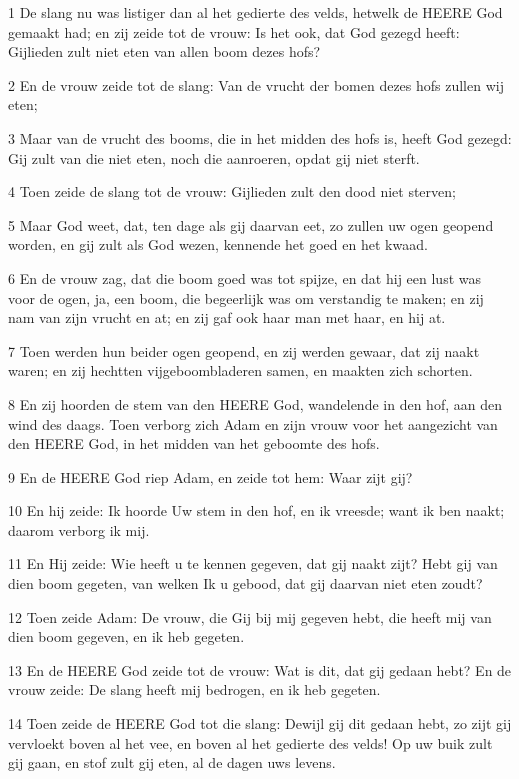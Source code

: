 \par 1 De slang nu was listiger dan al het gedierte des velds, hetwelk de HEERE God gemaakt had; en zij zeide tot de vrouw: Is het ook, dat God gezegd heeft: Gijlieden zult niet eten van allen boom dezes hofs?
\par 2 En de vrouw zeide tot de slang: Van de vrucht der bomen dezes hofs zullen wij eten;
\par 3 Maar van de vrucht des booms, die in het midden des hofs is, heeft God gezegd: Gij zult van die niet eten, noch die aanroeren, opdat gij niet sterft.
\par 4 Toen zeide de slang tot de vrouw: Gijlieden zult den dood niet sterven;
\par 5 Maar God weet, dat, ten dage als gij daarvan eet, zo zullen uw ogen geopend worden, en gij zult als God wezen, kennende het goed en het kwaad.
\par 6 En de vrouw zag, dat die boom goed was tot spijze, en dat hij een lust was voor de ogen, ja, een boom, die begeerlijk was om verstandig te maken; en zij nam van zijn vrucht en at; en zij gaf ook haar man met haar, en hij at.
\par 7 Toen werden hun beider ogen geopend, en zij werden gewaar, dat zij naakt waren; en zij hechtten vijgeboombladeren samen, en maakten zich schorten.
\par 8 En zij hoorden de stem van den HEERE God, wandelende in den hof, aan den wind des daags. Toen verborg zich Adam en zijn vrouw voor het aangezicht van den HEERE God, in het midden van het geboomte des hofs.
\par 9 En de HEERE God riep Adam, en zeide tot hem: Waar zijt gij?
\par 10 En hij zeide: Ik hoorde Uw stem in den hof, en ik vreesde; want ik ben naakt; daarom verborg ik mij.
\par 11 En Hij zeide: Wie heeft u te kennen gegeven, dat gij naakt zijt? Hebt gij van dien boom gegeten, van welken Ik u gebood, dat gij daarvan niet eten zoudt?
\par 12 Toen zeide Adam: De vrouw, die Gij bij mij gegeven hebt, die heeft mij van dien boom gegeven, en ik heb gegeten.
\par 13 En de HEERE God zeide tot de vrouw: Wat is dit, dat gij gedaan hebt? En de vrouw zeide: De slang heeft mij bedrogen, en ik heb gegeten.
\par 14 Toen zeide de HEERE God tot die slang: Dewijl gij dit gedaan hebt, zo zijt gij vervloekt boven al het vee, en boven al het gedierte des velds! Op uw buik zult gij gaan, en stof zult gij eten, al de dagen uws levens.
